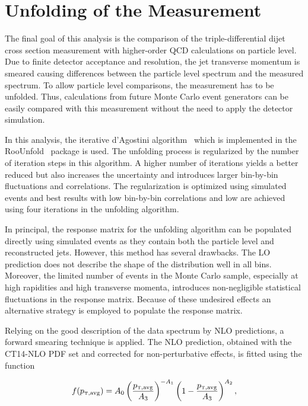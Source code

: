 \section{Unfolding of the Measurement}
\label{sec:unfolding}

The final goal of this analysis is the comparison of the triple-differential
dijet cross section measurement with higher-order QCD calculations on
particle level. Due to finite detector acceptance and resolution, the jet
transverse momentum is smeared causing differences between the particle level
\ptavg spectrum and the measured spectrum. To allow particle level comparisons,
the measurement has to be unfolded. Thus, calculations from future Monte Carlo
event generators can be easily compared with this measurement without the need to
apply the detector simulation.

In this analysis, the iterative d'Agostini algorithm~\cite{DAgostini:1994zf}
which is implemented in the RooUnfold~\cite{Adye:2011gm} package is used. The
unfolding process is regularized by the number of iteration steps in this
algorithm. A higher number of iterations yields a better reduced \chisq but also
increases the uncertainty and introduces larger bin-by-bin fluctuations and
correlations. The regularization is optimized using simulated events and best
results with low bin-by-bin correlations and low \chisq are achieved using
four iterations in the unfolding algorithm.

In principal, the response matrix for the unfolding algorithm can be populated
directly using simulated events as they contain both the particle level and
reconstructed jets. However, this method has several drawbacks. The LO
prediction does not describe the shape of the distribution well in all
bins. Moreover, the limited number of events in the Monte Carlo sample,
especially at high rapidities and high transverse momenta, introduces
non-negligible statistical fluctuations in the response matrix. Because of these
undesired effects an alternative strategy is employed to populate the response
matrix.

Relying on the good description of the data spectrum by NLO predictions, a forward
smearing technique is applied. The NLO prediction, obtained with the CT14-NLO PDF
set and corrected for non-perturbative effects, is fitted using the function

\begin{equation}
    f(\ptavg) = A_0 \left(
    \frac{\ptavg}{A_3}\right)^{-A_1}\left(1-\frac{\ptavg}{A_3}\right)^{A_2},
\end{equation}

